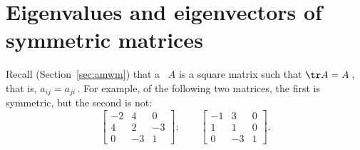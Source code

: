 
\chapter{Eigenvalues and eigenvectors of symmetric matrices}
\label{ch:eesm}
\minitoc


Recall (Section~\ref{sec:amwm}) that a ~\(A\) is a square matrix such that \(\tr A=A\)\,, that is, \(a_{ij}=a_{ji}\)\,.
For example, of the following two matrices, the first is symmetric, but the second is not:
\begin{equation*}
\begin{bmatrix} -2&4&0
\\4&2&-3
\\0&-3&1 \end{bmatrix};\qquad
\begin{bmatrix} -1&3&0
\\1&1&0
\\0&-3&1 \end{bmatrix}.
\end{equation*}

